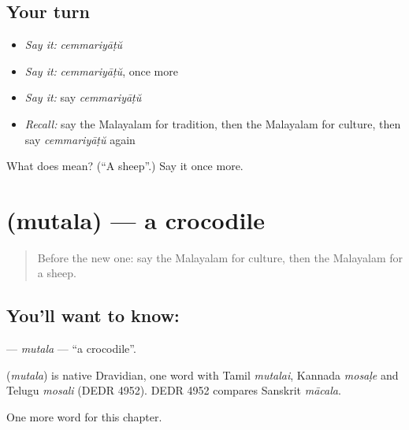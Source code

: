 \subsection*{Your turn}
\begin{itemize}
\raggedright
  \item \emph{Say it:} \emph{cemmariyāṭŭ}
  \item \emph{Say it:} \emph{cemmariyāṭŭ}, once more
  \item \emph{Say it:} say \emph{cemmariyāṭŭ}
  \item \emph{Recall:} say the Malayalam for tradition, then the Malayalam for culture, then say \emph{cemmariyāṭŭ} again
\end{itemize}

\begin{tcolorbox}[breakable,colback=teal!4,colframe=teal!35!black,title={Before you move on}]
What does  mean? (\textquotedblleft{}A sheep\textquotedblright{}.) Say it once more.
\end{tcolorbox}
\section[\texorpdfstring{\ml{മുതല} (mutala)}{മുതല (mutala)}]{ (mutala) — a crocodile}

\label{lesson:ML-C327-mutala}



\begin{quote}
Before the new one: say the Malayalam for culture, then the Malayalam for a sheep.
\end{quote}

\subsection*{You'll want to know: }
\textbf{} — \emph{mutala} — \textquotedblleft{}a crocodile\textquotedblright{}.

\begin{cousinweb}
\textbf{} (\emph{mutala}) is native Dravidian, one word with Tamil \emph{mutalai}, Kannada \emph{mosaḷe} and Telugu \emph{mosali} (DEDR 4952). DEDR 4952 compares Sanskrit \emph{mācala}.
\end{cousinweb}

\begin{grammarlens}[title={What you've built}]
One more word for this chapter.
\end{grammarlens}

